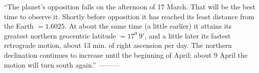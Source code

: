 “The planet's opposition falls on the afternoon of 17 March. That will be the best time to observe it. Shortly before opposition it has reached its least distance from the Earth
%
$=1.6025$. At about the same time (a little earlier) it attains its greatest northern geocentric latitude $=17^0\ 9'$, and a little later its fastest retrograde motion, about 13 min. of right ascension per day. The northern declination continues to increase until the beginning of April; about 9 April the motion will turn south again.” —\quad —\quad —
\begin{flushright}\end{flushright}

